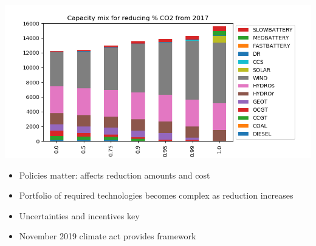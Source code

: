 \documentclass[xcolor=dvipsnames]{beamer}
\newcommand{\exclude}[1]{}
\begin{document}
\begin{frame}
\begin{columns}[T]
    \begin{column}{0.6\linewidth}
      \includegraphics[width=\textwidth]{includes/Sco2rednv20.png}
      \begin{itemize}
      \item Policies matter: affects reduction amounts and cost
      \item Portfolio of required technologies becomes complex as
        reduction increases
      \item Uncertainties and incentives key
      \item November 2019 climate act provides framework
      \end{itemize}
    \end{column}
  \end{columns}
  
\end{frame}


\exclude{
    Who are we, what are we doing.

  If we think of the goal for this talk as two-fold:  1) to describe
  WEREWOLF and 2) to pique their interest to participate in the policy
  discussion.
  
I would recommend to keep it high-level description to start and focus on the value proposition to ask them for their involvement.  They can ask you more detailed questions about the model in the Q\&A afterwards if they are interested.

I like the flow so far and the outputs in slides 6-10.  Although, I think we don't need to show them outputs for this meeting, as it is more of a briefing on WEREWOLF, where we are going with it and inviting them to participate if they are interested.

To gather their interest, we should focus on the value proposition for WEREWOLF to help guide government policy and, to some extent, utility investment decisions based on that policy.  
}
\end{document}
